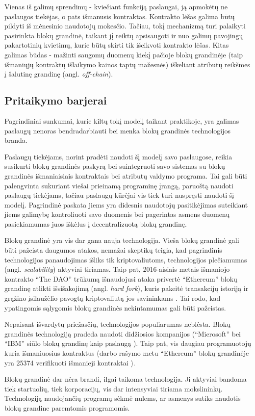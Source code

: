 Vienas iš galimų sprendimų - kviečiant funkciją paslaugai, ją apmokėtų ne paslaugos tiekėjas, o pats išmanusis kontraktas. Kontrakto lėšas
galima būtų pildyti iš mėnesinio naudotojų mokesčio.
Tačiau, tokį mechanizmą turi palaikyti pasirinkta blokų grandinė, taikant jį reiktų apsisaugoti ir nuo
galimų pavojingų pakartotinių kvietimų, kurie būtų skirti tik išeikvoti kontrakto lėšas. Kitas galimas būdas - mažinti saugomų duomenų kiekį
pačioje blokų grandinėje (taip išmaniųjų kontraktų išlaikymo kainos taptų mažesnės) iškeliant atributų reikšmes į šalutinę grandinę (angl. \textit{off-chain}).

\subsection{Pritaikymo barjerai}

Pagrindiniai sunkumai, kurie kiltų tokį modelį taikant praktikoje, yra galimas paslaugų nenoras bendradarbiauti bei menka blokų grandinės
technologijos branda.

Paslaugų tiekėjams, norint pradėti naudoti šį modelį savo paslaugose, reikia susikurti blokų grandinės paskyrą bei suintegruoti
savo sistemas su blokų grandinės išmaniaisiais kontraktais bei atributų valdymo programa.
Tai gali būti palengvinta sukuriant viešai prieinamą programinę įrangą, paruoštą naudoti paslaugų
tiekėjams, tačiau paslaugų kūrėjai vis tiek turi nuspręsti naudoti šį modelį. Pagrindinė paskata jiems yra didesnis naudotojų pasitikėjimas
suteikiant jiems galimybę kontroliuoti savo duomenis bei pagerintas asmens duomenų pasiekiamumas juos iškėlus į decentralizuotą blokų grandinę.

Blokų grandinė yra vis dar gana nauja technologija. Vieša blokų grandinė gali būti pažeista daugumos atakos, nemažai skeptikų
teigia, kad pagrindinis technologijos panaudojimas išliks tik kriptovaliutoms, technologijos plečiamumas (angl. \textit{scalability}) aktyviai
tiriamas. Taip pat, 2016-aisiais metais išmaniojo kontrakto \enquote{The DAO} trūkumą išnaudojusi ataka privertė \enquote{Ethereum} 
blokų grandinę atlikti išsišakojimą (angl. \textit{hard fork}), kuris pakeitė transakcijų istoriją ir grąžino įsilaužėlio
pavogtą kriptovaliutą jos savininkams \cite{TheDAO}. Tai rodo, kad ypatingomis sąlygomis blokų grandinės nekintamumas gali būti pažeistas.

Nepaisant išvardytų priežasčių, technologijos populiarumas neblėsta. Blokų grandinės technologiją pradeda naudoti didžiosios kompanijos
(\enquote{Microsoft} bei \enquote{IBM} siūlo
blokų grandinę kaip paslaugą \cite{Zheng2017}). Taip pat, vis daugiau programuotojų kuria išmaniuosius kontraktus
(darbo rašymo metu \enquote{Ethereum} blokų grandinėje yra 25374 verifikuoti išmanieji kontraktai \cite{EthVerifiedContracts}).

Blokų grandinė dar nėra brandi, ilgai taikoma technologija. Ji aktyviai bandoma tiek startuolių, tiek
korporacijų, vis dar intensyviai tiriama mokslininkų. Technologiją naudojančių programų sėkmė nulems, ar asmenys
sutiks naudotis blokų grandine paremtomis programomis.




